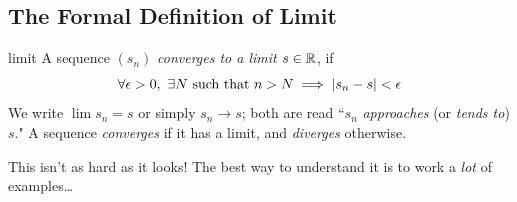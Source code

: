 \clearpage

\iffalse


\subsection{The Formal Definition of Limit}\label{sec:limitdef}


\begin{defn}{}{limit}
A sequence $(s_n)$ \emph{converges to a limit $s\in\mathbb{R}$}, if\footnotemark
\[\forall\epsilon>0,\ \exists N\ \text{such that}\ n>N\implies \nm{s_n-s}<\epsilon\]
We write $\lim s_n=s$ or simply $s_n\to s$; both are read ``$s_n$ \emph{approaches} (or \emph{tends to}) $s$."\smallbreak
A sequence \emph{converges} if it has a limit, and \emph{diverges} otherwise.
\end{defn}


This isn't as hard as it looks! The best way to understand it is to work a \emph{lot} of examples\ldots





